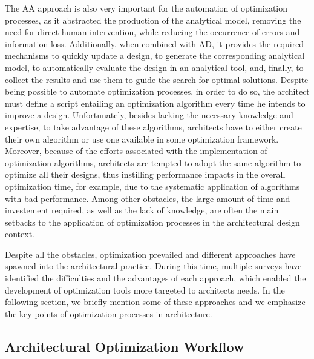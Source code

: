 The \ac{AA} approach is also very important for the automation of optimization processes, as it abstracted the production of the analytical model, removing the need for direct human intervention, while reducing the occurrence of errors and information loss. Additionally, when combined with \ac{AD}, it provides the required mechanisms to quickly update a design, to generate the corresponding analytical model, to automatically evaluate the design in an analytical tool, and, finally, to collect the results and use them to guide the search for optimal solutions. Despite being possible to automate optimization processes, in order to do so, the architect must define a script entailing an optimization algorithm every time he intends to improve a design. Unfortunately, besides lacking the necessary knowledge and expertise, to take advantage of these algorithms, architects have to either create their own algorithm or use one available in some optimization framework. Moreover, because of the efforts associated with the implementation of optimization algorithms, architects are tempted to adopt the same algorithm to optimize all their designs, thus instilling performance impacts in the overall optimization time, for example, due to the  systematic application of algorithms with bad performance. Among other obstacles, the large amount of time and investement required, as well as the lack of knowledge, are often the main setbacks to the application of optimization processes in the architectural design context. 

Despite all the obstacles, optimization prevailed and different approaches have spawned into the architectural practice. During this time, 
multiple surveys have identified the difficulties and the advantages of each approach, which enabled the development of optimization tools more targeted to architects needs. In the following section, we briefly mention some of these approaches and we emphasize the key points of optimization processes in architecture.
	
\subsection{Architectural Optimization Workflow}
	
